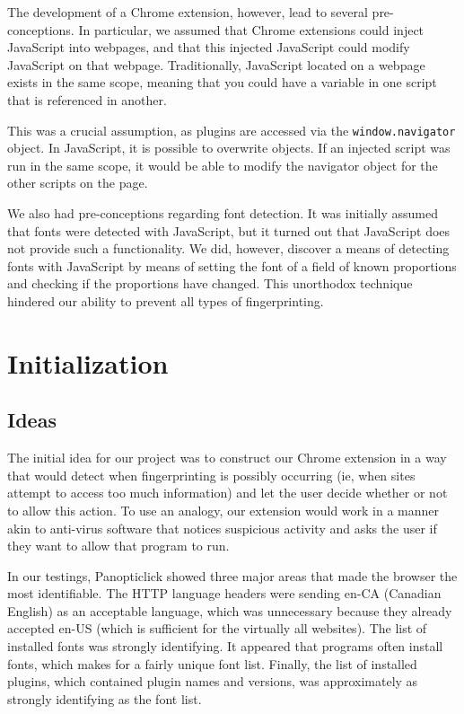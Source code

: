 \documentclass[12pt,a4paper]{article}
\begin{document}
The development of a Chrome extension, however, lead to several pre-conceptions. In particular, we assumed that Chrome extensions could inject JavaScript into webpages, and that this injected JavaScript could modify JavaScript on that webpage. Traditionally, JavaScript located on a webpage exists in the same scope, meaning that you could have a variable in one script that is referenced in another.

This was a crucial assumption, as plugins are accessed via the \texttt{window.navigator} object. In JavaScript, it is possible to overwrite objects. If an injected script was run in the same scope, it would be able to modify the navigator object for the other scripts on the page.

We also had pre-conceptions regarding font detection. It was initially assumed that fonts were detected with JavaScript, but it turned out that JavaScript does not provide such a functionality. We did, however, discover a means of detecting fonts with JavaScript by means of setting the font of a field of known proportions and checking if the proportions have changed. This unorthodox technique hindered our ability to prevent all types of fingerprinting.

\section{Initialization}

\subsection{Ideas}
The initial idea for our project was to construct our Chrome extension in a way that would detect when fingerprinting is possibly occurring (ie, when sites attempt to access too much information) and let the user decide whether or not to allow this action. To use an analogy, our extension would work in a manner akin to anti-virus software that notices suspicious activity and asks the user if they want to allow that program to run.

In our testings, Panopticlick showed three major areas that made the browser the most identifiable. The HTTP language headers were sending en-CA (Canadian English) as an acceptable language, which was unnecessary because they already accepted en-US (which is sufficient for the virtually all websites). The list of installed fonts was strongly identifying. It appeared that programs often install fonts, which makes for a fairly unique font list. Finally, the list of installed plugins, which contained plugin names and versions, was approximately as strongly identifying as the font list.
\end{document}
